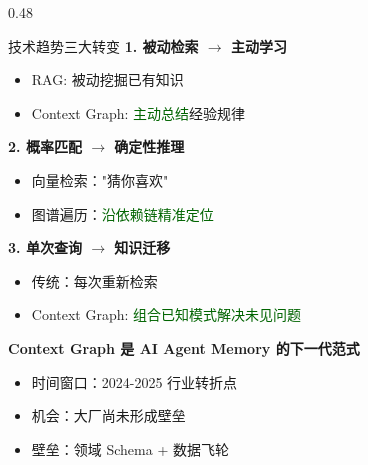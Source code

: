 \documentclass[aspectratio=169,10pt]{beamer}
\begin{document}
\begin{frame}
\begin{columns}[T]
    \begin{column}{0.48\textwidth}
      \begin{block}{技术趋势三大转变}
        \scriptsize
        \textbf{1. 被动检索 $\to$ 主动学习}
        \begin{itemize}
          \item RAG: 被动挖掘已有知识
          \item Context Graph: \textcolor{darkgreen}{主动总结}经验规律
        \end{itemize}

        \vspace{0.05cm}
        \textbf{2. 概率匹配 $\to$ 确定性推理}
        \begin{itemize}
          \item 向量检索："猜你喜欢"
          \item 图谱遍历：\textcolor{darkgreen}{沿依赖链精准定位}
        \end{itemize}

        \vspace{0.05cm}
        \textbf{3. 单次查询 $\to$ 知识迁移}
        \begin{itemize}
          \item 传统：每次重新检索
          \item Context Graph: \textcolor{darkgreen}{组合已知模式解决未见问题}
        \end{itemize}
      \end{block}

      \vspace{0.05cm}

      \begin{tcolorbox}[colback=layer1, title=\textbf{战略判断}]
        \scriptsize
        \textbf{Context Graph 是 AI Agent Memory 的下一代范式}
        \begin{itemize}
          \item 时间窗口：2024-2025 行业转折点
          \item 机会：大厂尚未形成壁垒
          \item 壁垒：领域 Schema + 数据飞轮
        \end{itemize}
      \end{tcolorbox}
    \end{column}
  \end{columns}
\end{frame}
\end{document}
